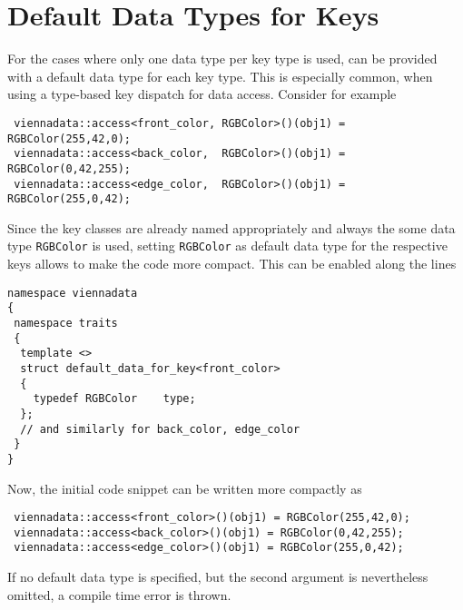 \section{Default Data Types for Keys} \label{sec:default-valuetype}
For the cases where only one data type per key type is used, {\ViennaData} can be provided with a default data type for each key type.
This is especially common, when using a type-based key dispatch for data access. Consider for example
\begin{lstlisting}
 viennadata::access<front_color, RGBColor>()(obj1) = RGBColor(255,42,0);
 viennadata::access<back_color,  RGBColor>()(obj1) = RGBColor(0,42,255);
 viennadata::access<edge_color,  RGBColor>()(obj1) = RGBColor(255,0,42);
\end{lstlisting}
Since the key classes are already named appropriately and always the some data type \lstinline|RGBColor| is used, 
setting \lstinline|RGBColor| as default data type for the respective keys allows to make the code more compact.
This can be enabled along the lines
\begin{lstlisting}
namespace viennadata
{
 namespace traits
 {
  template <>
  struct default_data_for_key<front_color>
  {
    typedef RGBColor    type;
  };
  // and similarly for back_color, edge_color
 }
} 
\end{lstlisting}
Now, the initial code snippet can be written more compactly as
\begin{lstlisting}
 viennadata::access<front_color>()(obj1) = RGBColor(255,42,0);
 viennadata::access<back_color>()(obj1) = RGBColor(0,42,255);
 viennadata::access<edge_color>()(obj1) = RGBColor(255,0,42);
\end{lstlisting}
If no default data type is specified, but the second argument is nevertheless omitted, a compile time error is thrown.